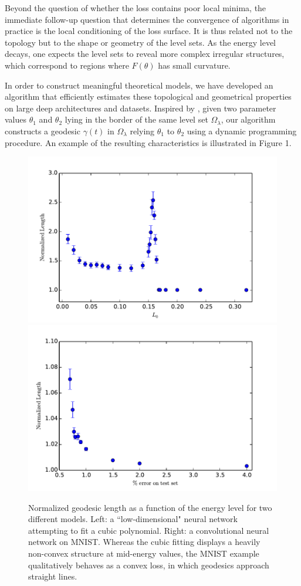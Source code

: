 \documentclass[10pt]{article}
\begin{document}
Beyond the question of whether the loss contains poor local minima, the immediate follow-up question that determines the convergence of algorithms in practice is the local conditioning of the loss surface. It is thus related not to the topology but to the shape or geometry of the level sets. As the energy level decays, one expects the level sets to reveal more complex irregular structures, which correspond to regions where $F(\theta)$ has small curvature.

In order to construct meaningful theoretical models, we have developed an algorithm that efficiently estimates these topological and geometrical properties on large deep architectures and datasets. Inspired by \cite{goodfellow2014qualitatively}, given two parameter values $\theta_1$ and $\theta_2$ lying in the border of the same level set $\Omega_\lambda$, our algorithm constructs a geodesic $\gamma(t)$ in $\Omega_\lambda$ relying $\theta_1$ to $\theta_2$ using a dynamic programming procedure. An example of the resulting characteristics is illustrated in Figure 1. 

\begin{figure}
\label{figurelength}
\centering
\includegraphics[width=.4\textwidth]{../Writeup/Plots/normlengthcubics}
\includegraphics[width=.4\textwidth]{../Writeup/Plots/normlengthMNIST}
\caption{Normalized geodesic length as a function of the energy level for two different models. Left: a ``low-dimensional" neural network 
attempting to fit a cubic polynomial. Right: a convolutional neural network on MNIST. Whereas the cubic fitting displays a heavily non-convex structure 
at mid-energy values, the MNIST example qualitatively behaves as a convex loss, in which geodesics approach straight lines.}
\end{figure}
\end{document}

